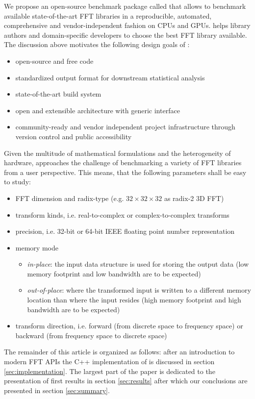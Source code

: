 We propose an open-source benchmark package called \gearshifft{} \citep{gearshifft_github} that allows to benchmark available state-of-the-art FFT libraries in a reproducible, automated, comprehensive and vendor-independent fashion on CPUs and GPUs.
\gearshifft{} helps library authors and domain-specific developers to choose the best FFT library available. The discussion above motivates the following design goals of \gearshifft{}:
%
\begin{itemize}
\item open-source and free code
\item standardized output format for downstream statistical analysis
\item state-of-the-art build system
\item open and extensible architecture with generic interface
\item community-ready and vendor independent project infrastructure through version control and public accessibility
\end{itemize}
%
Given the multitude of mathematical formulations and the heterogeneity of hardware, \gearshifft{} approaches the challenge of benchmarking a variety of FFT libraries from a user perspective. This means, that the following parameters shall be easy to study:
%
\begin{itemize}
\item FFT dimension and radix-type (e.g. $32{\times}32{\times}32$ as radix-2 3D FFT)
\item transform kinds, i.e. real-to-complex or complex-to-complex transforms
\item precision, i.e. 32-bit or 64-bit IEEE floating point number representation
\item memory mode
  \begin{itemize}
  \item \emph{in-place}: the input data structure is used for storing the output data (low memory footprint and low bandwidth are to be expected)
  \item \emph{out-of-place}:  where the transformed input is written to a different memory location than where the input resides (high memory footprint and high bandwidth are to be expected)
  \end{itemize}
\item transform direction, i.e. forward (from discrete space to frequency space) or backward (from frequency space to discrete space)
\end{itemize}
%
The remainder of this article is organized as follows: after an introduction to modern FFT APIs the C++ implementation of \gearshifft{} is discussed in section \ref{sec:implementation}. The largest part of the paper is dedicated to the presentation of first results in section \ref{sec:results} after which our conclusions are presented in section \ref{sec:summary}.

